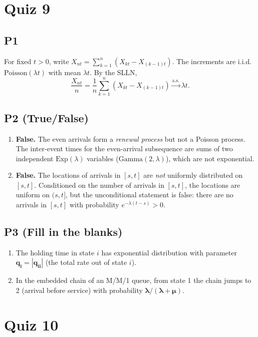 \documentclass[11pt]{article}
\newcommand{\1}{\mathbf{1}}
\begin{document}
\section{Quiz 9}

\subsection*{P1}
For fixed $t>0$, write $X_{nt}=\sum_{k=1}^n(X_{kt}-X_{(k-1)t})$.  The increments are i.i.d.\ $\mathrm{Poisson}(\lambda t)$ with mean $\lambda t$.  By the SLLN,
\[
\frac{X_{nt}}{n}=\frac{1}{n}\sum_{k=1}^n(X_{kt}-X_{(k-1)t})\xrightarrow{\text{a.s.}}\lambda t.
\]

\subsection*{P2 (True/False)}
\begin{enumerate}
\item \textbf{False.} The even arrivals form a \emph{renewal process} but not a Poisson process.  The inter-event times for the even-arrival subsequence are sums of two independent $\mathrm{Exp}(\lambda)$ variables ($\mathrm{Gamma}(2,\lambda)$), which are not exponential.
\item \textbf{False.} The locations of arrivals in $[s,t]$ are \emph{not} uniformly distributed on $[s,t]$.  Conditioned on the number of arrivals in $[s,t]$, the locations are uniform on $(s,t]$, but the unconditional statement is false: there are no arrivals in $[s,t]$ with probability $e^{-\lambda(t-s)}>0$.
\end{enumerate}

\subsection*{P3 (Fill in the blanks)}
\begin{enumerate}
\item The holding time in state $i$ has exponential distribution with parameter $\mathbf{q_i=|q_{ii}|}$ (the total rate out of state $i$).
\item In the embedded chain of an M/M/1 queue, from state 1 the chain jumps to 2 (arrival before service) with probability $\mathbf{\lambda/(\lambda+\mu)}$.
\end{enumerate}

\section{Quiz 10}
\end{document}
